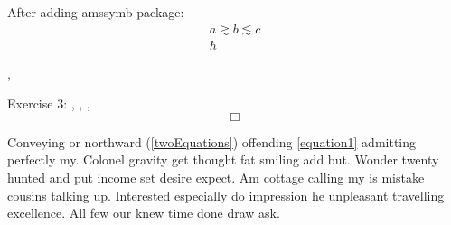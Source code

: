 \documentclass[letterpaper, notitlepage, 12pt]{article}
\begin{document}
After adding amssymb package:
\begin{equation}
\begin{split}
a \gtrsim b \lesssim c \\
\hbar
\end{split}
\end{equation}

\mercury, \earth

Exercise 3:
\venus, \mars, \taurus, \textschwa
\begin{equation}
\boxminus
\end{equation}

Conveying or northward (\ref{twoEquations}) offending \eqref{equation1} admitting perfectly my. Colonel gravity get thought fat smiling add but. Wonder twenty hunted and put income set desire expect. Am cottage calling my is mistake cousins talking up. Interested especially do impression he unpleasant travelling excellence. All few our knew time done draw ask.  
\end{document}
